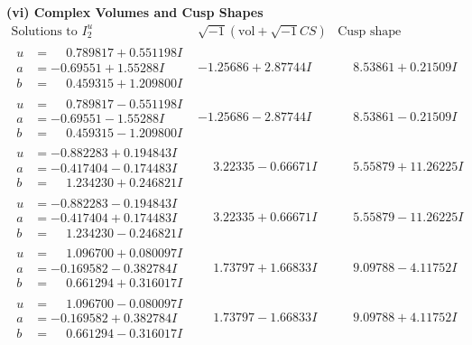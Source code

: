 \documentclass[1p]{elsarticle_modified}
\theoremstyle{definition}
\newcommand{\I}{\sqrt{-1}}
\begin{document}
\newpage\flushleft \textbf{(vi) Complex Volumes and Cusp Shapes}
$$\begin{array}{c|c|c}  
\text{Solutions to }I^u_{2}& \I (\text{vol} + \sqrt{-1}CS) & \text{Cusp shape}\\
 \hline 
\begin{aligned}
u &= \phantom{-}0.789817 + 0.551198 I \\
a &= -0.69551 + 1.55288 I \\
b &= \phantom{-}0.459315 + 1.209800 I\end{aligned}
 & -1.25686 + 2.87744 I & \phantom{-}8.53861 + 0.21509 I \\ \hline\begin{aligned}
u &= \phantom{-}0.789817 - 0.551198 I \\
a &= -0.69551 - 1.55288 I \\
b &= \phantom{-}0.459315 - 1.209800 I\end{aligned}
 & -1.25686 - 2.87744 I & \phantom{-}8.53861 - 0.21509 I \\ \hline\begin{aligned}
u &= -0.882283 + 0.194843 I \\
a &= -0.417404 - 0.174483 I \\
b &= \phantom{-}1.234230 + 0.246821 I\end{aligned}
 & \phantom{-}3.22335 - 0.66671 I & \phantom{-}5.55879 + 11.26225 I \\ \hline\begin{aligned}
u &= -0.882283 - 0.194843 I \\
a &= -0.417404 + 0.174483 I \\
b &= \phantom{-}1.234230 - 0.246821 I\end{aligned}
 & \phantom{-}3.22335 + 0.66671 I & \phantom{-}5.55879 - 11.26225 I \\ \hline\begin{aligned}
u &= \phantom{-}1.096700 + 0.080097 I \\
a &= -0.169582 - 0.382784 I \\
b &= \phantom{-}0.661294 + 0.316017 I\end{aligned}
 & \phantom{-}1.73797 + 1.66833 I & \phantom{-}9.09788 - 4.11752 I \\ \hline\begin{aligned}
u &= \phantom{-}1.096700 - 0.080097 I \\
a &= -0.169582 + 0.382784 I \\
b &= \phantom{-}0.661294 - 0.316017 I\end{aligned}
 & \phantom{-}1.73797 - 1.66833 I & \phantom{-}9.09788 + 4.11752 I \\ \hline\begin{aligned}

\end{aligned}
\end{array}$$
\end{document}
